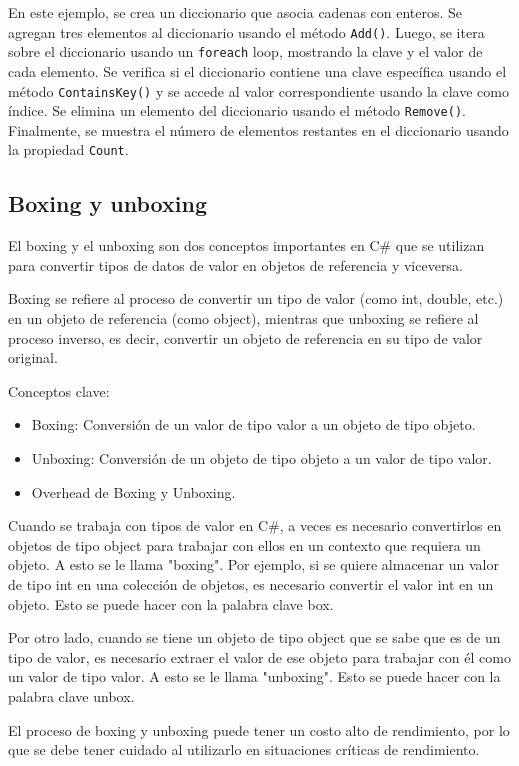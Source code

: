 \documentclass[executivepaper]{article}
\begin{document}
En este ejemplo, se crea un diccionario que asocia cadenas con enteros. Se agregan tres elementos al diccionario usando el método \texttt{Add()}. Luego, se itera sobre el diccionario usando un \texttt{foreach} loop, mostrando la clave y el valor de cada elemento. Se verifica si el diccionario contiene una clave específica usando el método \texttt{ContainsKey()} y se accede al valor correspondiente usando la clave como índice. Se elimina un elemento del diccionario usando el método \texttt{Remove()}. Finalmente, se muestra el número de elementos restantes en el diccionario usando la propiedad \texttt{Count}.

\subsection*{Boxing y unboxing}

El boxing y el unboxing son dos conceptos importantes en C\# que se utilizan para convertir tipos de datos de valor en objetos de referencia y viceversa.

Boxing se refiere al proceso de convertir un tipo de valor (como int, double, etc.) en un objeto de referencia (como object), mientras que unboxing se refiere al proceso inverso, es decir, convertir un objeto de referencia en su tipo de valor original.

Conceptos clave:
\begin{itemize}
\item Boxing: Conversión de un valor de tipo valor a un objeto de tipo objeto.
\item Unboxing: Conversión de un objeto de tipo objeto a un valor de tipo valor.
\item Overhead de Boxing y Unboxing.
\end{itemize}

Cuando se trabaja con tipos de valor en C\#, a veces es necesario convertirlos en objetos de tipo object para trabajar con ellos en un contexto que requiera un objeto. A esto se le llama "boxing". Por ejemplo, si se quiere almacenar un valor de tipo int en una colección de objetos, es necesario convertir el valor int en un objeto. Esto se puede hacer con la palabra clave box.

Por otro lado, cuando se tiene un objeto de tipo object que se sabe que es de un tipo de valor, es necesario extraer el valor de ese objeto para trabajar con él como un valor de tipo valor. A esto se le llama "unboxing". Esto se puede hacer con la palabra clave unbox.

El proceso de boxing y unboxing puede tener un costo alto de rendimiento, por lo que se debe tener cuidado al utilizarlo en situaciones críticas de rendimiento.
\end{document}
